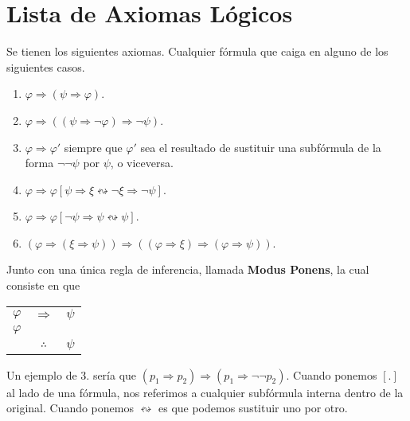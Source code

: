 \documentclass[12pt]{report}
\theoremstyle{largebreak}
\begin{document}
    \section{Lista de Axiomas Lógicos}    

    \begin{mydef}
        Se tienen los siguientes axiomas. Cualquier fórmula que caiga en alguno de los siguientes casos.
        \begin{enumerate}
            \item $\varphi\Rightarrow (\psi\Rightarrow \varphi)$.
            \item $\varphi\Rightarrow ((\psi\Rightarrow\neg\varphi)\Rightarrow \neg\psi)$.
            \item $\varphi\Rightarrow\varphi'$ siempre que $\varphi'$ sea el resultado de sustituir una subfórmula de la forma $\neg\neg\psi$ por $\psi$, o viceversa.
            \item $\varphi\Rightarrow \varphi[\psi\Rightarrow\xi \leftrightsquigarrow\neg\xi\Rightarrow \neg\psi]$.
            \item $\varphi\Rightarrow\varphi[\neg\psi\Rightarrow\psi\leftrightsquigarrow\psi]$.
            \item $(\varphi\Rightarrow(\xi\Rightarrow\psi))\Rightarrow((\varphi\Rightarrow\xi)\Rightarrow(\varphi\Rightarrow\psi))$.
        \end{enumerate}
        Junto con una única regla de inferencia, llamada \textbf{Modus Ponens}, la cual consiste en que
        \begin{center}
            \begin{tabular}{c c c}
                $\varphi$ & $\Rightarrow$ & $\psi$ \\
                $\varphi$ &  &  \\
                \hline
                 & $\therefore$ & $\psi$ \\
            \end{tabular}
        \end{center}
    \end{mydef}

    Un ejemplo de 3. sería que $(p_1\Rightarrow p_2)\Rightarrow(p_1\Rightarrow \neg\neg p_2)$. Cuando ponemos $[.]$ al lado de una fórmula, nos referimos a cualquier subfórmula interna dentro de la original. Cuando ponemos $\leftrightsquigarrow$ es que podemos sustituir uno por otro.
\end{document}
